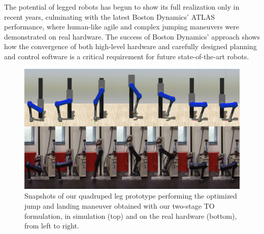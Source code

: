 The potential of legged robots has begun to show its full realization only in recent years, culminating with the latest Boston Dynamics' ATLAS~\cite{agile_bots::atlas_gets_grip} performance, where human-like agile and complex jumping maneuvers were demonstrated on real hardware. The success of Boston Dynamics' approach shows how the convergence of both high-level hardware and carefully designed planning and control software is a critical requirement for future state-of-the-art robots. 
\begin{figure}[t]
    \centering
    \includegraphics[width=0.98\columnwidth]{images/jumping_sequence_real_sim_compressed.pdf}
    \caption{Snapshots of our quadruped leg prototype performing the optimized jump and landing maneuver obtained with our two-stage TO formulation, in simulation (top) and on the real hardware (bottom), from left to right.}
    \label{fig:jumping_sequence}
\end{figure}

